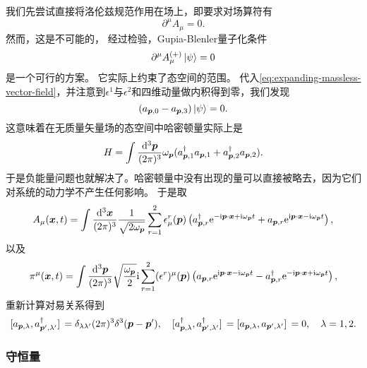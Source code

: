 \documentclass[hyperref, UTF8, a4paper]{ctexart}
\newcommand*{\ii}{\mathrm{i}}
\newcommand*{\ee}{\mathrm{e}}
\begin{document}
我们先尝试直接将洛伦兹规范作用在场上，即要求对场算符有
\[
    \partial^\mu A_\mu = 0.
\]
然而，这是不可能的，
经过检验，Gupia-Blenler量子化条件
\begin{equation}
    \partial^\mu {A}_\mu^{(+)} \ket{\psi} = 0
\end{equation}
是一个可行的方案。%
它实际上约束了态空间的范围。
代入\eqref{eq:expanding-massless-vector-field}，并注意到$\epsilon^1$与$\epsilon^2$和四维动量做内积得到零，我们发现
\begin{equation}
    ({a}_{\vb*{p}, 0} - {a}_{\vb*{p}, 3}) \ket{\psi} = 0.
\end{equation}
这意味着在无质量矢量场的态空间中哈密顿量实际上是
\begin{equation}
    {H} = \int \frac{\dd[3]{\vb*{p}}}{(2\pi)^3} \omega_{\vb*{p}} ({a}_{\vb*{p},1}^\dagger {a}_{\vb*{p}, 1} + {a}_{\vb*{p},2}^\dagger {a}_{\vb*{p}, 2}).
\end{equation}
于是负能量问题也就解决了。哈密顿量中没有出现的量可以直接被略去，因为它们对系统的动力学不产生任何影响。
于是取
\begin{equation}
    A_\mu (\vb*{x}, t) = \int \frac{\dd[3]{\vb*{x}}}{(2\pi)^3} \frac{1}{\sqrt{2 \omega_{\vb*{p}}}} \sum_{r=1}^2 \epsilon_\mu^r(\vb*{p}) \left({a}_{\vb*{p}, r}^\dagger \ee^{ - \ii \vb*{p} \cdot \vb*{x} + \ii \omega_{\vb*{p}} t} + {a}_{\vb*{p}, r} \ee^{ \ii \vb*{p} \cdot \vb*{x} - \ii \omega_{\vb*{p}} t} \right),
\end{equation}
以及
\begin{equation}
    \pi^\mu (\vb*{x}, t) = \int \frac{\dd[3]{\vb*{p}}}{(2\pi)^3} \sqrt{\frac{\omega_{\vb*{p}}}{2}} \ii \sum_{r=1}^2 (\epsilon^r)^\mu (\vb*{p}) \left( {a}_{\vb*{p}, r} \ee^{\ii \vb*{p} \cdot \vb*{x} - \ii \omega_{\vb*{p}} t} - {a}_{\vb*{p}, r}^\dagger \ee^{ - \ii \vb*{p} \cdot \vb*{x} + \ii \omega_{\vb*{p}} t} \right),
\end{equation}
重新计算对易关系得到
\begin{equation}
    \comm*{{a}_{\vb*{p}, \lambda}}{{a}^\dagger_{\vb*{p}', \lambda'}} = \delta_{\lambda \lambda'} (2\pi)^3 \delta^3(\vb*{p} - \vb*{p}'), \quad \comm*{{a}^\dagger_{\vb*{p}, \lambda}}{{a}^\dagger_{\vb*{p}', \lambda'}} = \comm*{{a}_{\vb*{p}, \lambda}}{{a}_{\vb*{p}', \lambda'}} = 0, \quad \lambda = 1, 2.
\end{equation}

\subsubsection{守恒量}
\end{document}

